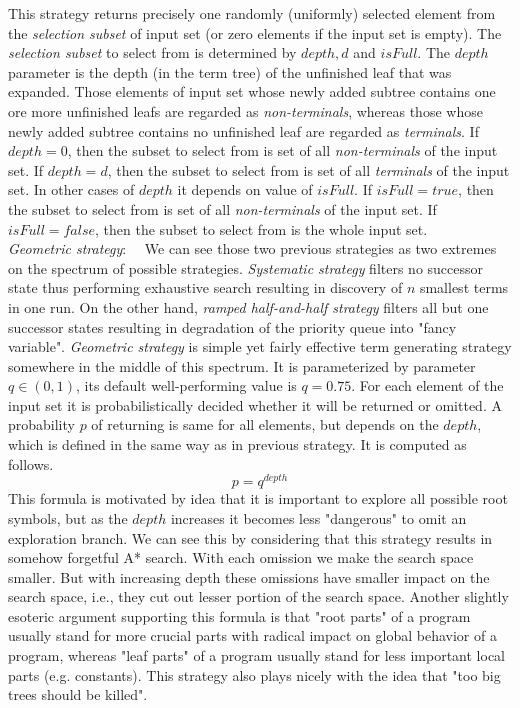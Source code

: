 \documentclass[conference]{IEEEtran}
\begin{document}
This strategy returns precisely one randomly
(uniformly) selected  element from 
the \textit{selection subset} of input set
(or zero elements if the input set is empty). 
The \textit{selection subset} 
to select from is determined by $depth, d$ and $isFull$.
The $depth$ parameter is the depth (in the term tree) 
of the unfinished leaf that was expanded.
Those elements of input set whose newly added subtree contains one ore more 
unfinished leafs are regarded as \textit{non-terminals}, whereas 
those whose newly added subtree contains no unfinished leaf are regarded as 
\textit{terminals}.
If $depth = 0$, then the subset to select from is  
set of all \textit{non-terminals} of the input set.
If $depth = d$, then the subset to select from is
set of all \textit{terminals} of the input set.
In other cases of $depth$ it depends on value of $isFull$.
If $isFull = true$, then the subset to select from is 
set of all \textit{non-terminals} of the input set.
If $isFull = false$, then the subset to select from is 
the whole input set.\\

\textit{Geometric strategy}:~~
We can see those two previous strategies as two extremes on the spectrum of 
possible strategies. 
\textit{Systematic strategy} filters no successor state thus performing
exhaustive search resulting in discovery of $n$ smallest terms in one run.
On the other hand, \textit{ramped half-and-half strategy} filters 
all but one successor states resulting in degradation of 
the priority queue into "fancy variable".
\textit{Geometric strategy} is simple yet fairly effective term generating 
strategy somewhere in the middle of this spectrum.
It is parameterized by parameter $q \in (0,1)$, its default well-performing 
value is $q = 0.75$.
For each element of the input set 
it is probabilistically decided whether
it will be returned or omitted. A probability $p$ of returning is
same for all elements, but depends on the $depth$, 
which is defined in the same way as in previous strategy. 
It is computed as follows.
$$ p = q^{depth} $$
This formula is motivated by idea that it is important to
explore all possible root symbols, but as the $depth$ 
increases it becomes less "dangerous" to omit 
an exploration branch. 
We can see this by considering that this strategy results in
somehow forgetful A* search.
With each omission we make the search space smaller. But with
increasing depth these omissions have smaller impact on the search space,
i.e., they cut out lesser portion of the search space.
Another slightly esoteric argument supporting this formula is that "root 
parts" of a program usually stand for more crucial parts
with radical impact on global behavior of a program, 
whereas "leaf parts" of a program usually
stand for less important local parts (e.g. constants).  
This strategy also plays nicely with the idea that 
"too big trees should be killed".
\end{document}
